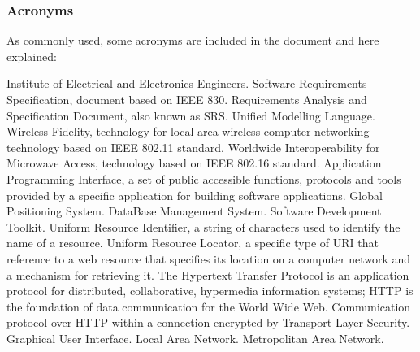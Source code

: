 \subsubsection{Acronyms}
As commonly used, some acronyms are included in the document and here explained:
\begin{itemize}
	 Institute of Electrical and Electronics Engineers.
	 Software Requirements Specification, document based on IEEE 830.
	 Requirements Analysis and Specification Document, also known as SRS.
	 Unified Modelling Language.
	 Wireless Fidelity, technology for local area wireless computer networking technology based on IEEE 802.11 standard.
	 Worldwide Interoperability for Microwave Access, technology based on IEEE 802.16 standard.
	 Application Programming Interface, a set of public accessible functions, protocols and tools provided by a specific application for building software applications.
	 Global Positioning System.
	 DataBase Management System.
	 Software Development Toolkit.
	 Uniform Resource Identifier, a string of characters used to identify the name of a resource.
	 Uniform Resource Locator, a specific type of URI that reference to a web resource that specifies its location on a computer network and a mechanism for retrieving it.
	 The Hypertext Transfer Protocol is an application protocol for distributed, collaborative, hypermedia information systems; HTTP is the foundation of data communication for the World Wide Web.
	 Communication protocol over HTTP within a connection encrypted by Transport Layer Security.
	 Graphical User Interface.
	 Local Area Network.
	 Metropolitan Area Network.
\end{itemize}
